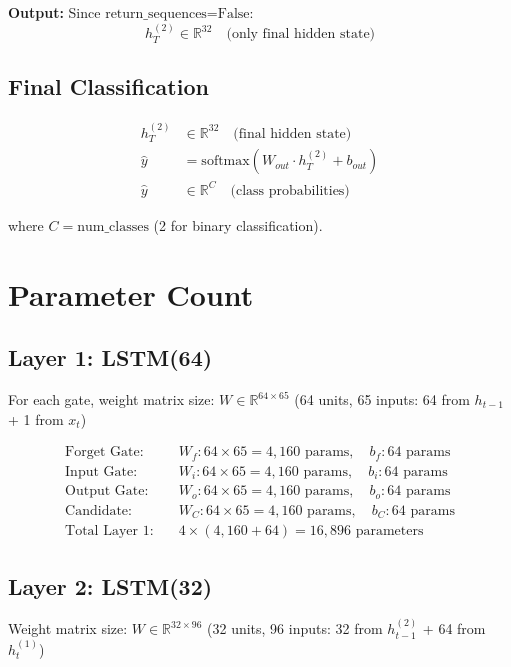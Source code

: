\documentclass[12pt]{article}
\begin{document}
\textbf{Output:} Since $\text{return\_sequences=False}$:
\[
h_T^{(2)} \in \mathbb{R}^{32} \quad \text{(only final hidden state)}
\]

\subsection{Final Classification}

\[
\begin{aligned}
h_T^{(2)} &\in \mathbb{R}^{32} \quad \text{(final hidden state)} \\
\hat{y} &= \text{softmax}(W_{out} \cdot h_T^{(2)} + b_{out}) \\
\hat{y} &\in \mathbb{R}^{C} \quad \text{(class probabilities)}
\end{aligned}
\]

where $C = \text{num\_classes}$ (2 for binary classification).

\section{Parameter Count}

\subsection{Layer 1: LSTM(64)}

For each gate, weight matrix size: $W \in \mathbb{R}^{64 \times 65}$ (64 units, 65 inputs: 64 from $h_{t-1}$ + 1 from $x_t$)

\[
\begin{aligned}
\text{Forget Gate:} &\quad W_f: 64 \times 65 = 4,160 \text{ params}, \quad b_f: 64 \text{ params} \\
\text{Input Gate:} &\quad W_i: 64 \times 65 = 4,160 \text{ params}, \quad b_i: 64 \text{ params} \\
\text{Output Gate:} &\quad W_o: 64 \times 65 = 4,160 \text{ params}, \quad b_o: 64 \text{ params} \\
\text{Candidate:} &\quad W_C: 64 \times 65 = 4,160 \text{ params}, \quad b_C: 64 \text{ params} \\
\text{Total Layer 1:} &\quad 4 \times (4,160 + 64) = 16,896 \text{ parameters}
\end{aligned}
\]

\subsection{Layer 2: LSTM(32)}

Weight matrix size: $W \in \mathbb{R}^{32 \times 96}$ (32 units, 96 inputs: 32 from $h_{t-1}^{(2)}$ + 64 from $h_t^{(1)}$)
\end{document}
